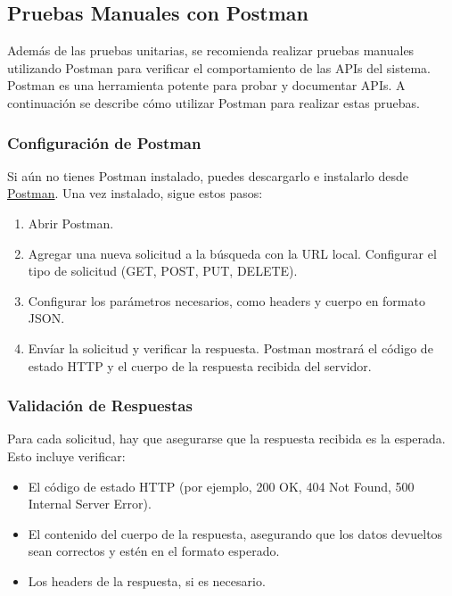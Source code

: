\subsection{Pruebas Manuales con Postman}

Además de las pruebas unitarias, se recomienda realizar pruebas manuales utilizando Postman para verificar el comportamiento de las APIs del sistema. Postman es una herramienta potente para probar y documentar APIs. A continuación se describe cómo utilizar Postman para realizar estas pruebas.

\subsubsection{Configuración de Postman}
Si aún no tienes Postman instalado, puedes descargarlo e instalarlo desde \href{https://www.postman.com/downloads/}{Postman}. Una vez instalado, sigue estos pasos:

\begin{enumerate}
    \item Abrir Postman.
    \item Agregar una nueva solicitud a la búsqueda con la URL local. Configurar el tipo de solicitud (GET, POST, PUT, DELETE).
    \item Configurar los parámetros necesarios, como headers y cuerpo en formato JSON.
    \item Envíar la solicitud y verificar la respuesta. Postman mostrará el código de estado HTTP y el cuerpo de la respuesta recibida del servidor.
\end{enumerate}

\subsubsection{Validación de Respuestas}
Para cada solicitud, hay que asegurarse que la respuesta recibida es la esperada. Esto incluye verificar:
\begin{itemize}
    \item El código de estado HTTP (por ejemplo, 200 OK, 404 Not Found, 500 Internal Server Error).
    \item El contenido del cuerpo de la respuesta, asegurando que los datos devueltos sean correctos y estén en el formato esperado.
    \item Los headers de la respuesta, si es necesario.
\end{itemize}
